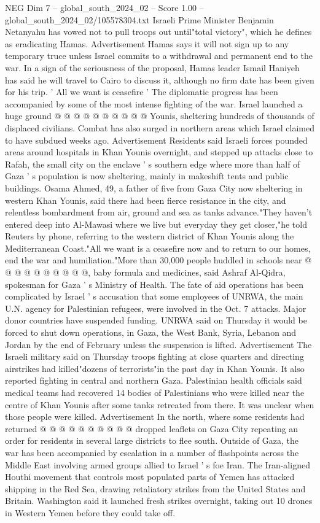 \begin{textsample}{NEG Dim 7 – global\_south\_2024\_02 – Score 1.00 – global\_south\_2024\_02/105578304.txt}
Israeli Prime Minister Benjamin Netanyahu has vowed not to pull troops out until"total victory", which he defines as eradicating Hamas.
Advertisement Hamas says it will not sign up to any temporary truce unless Israel commits to a withdrawal and permanent end to the war.
In a sign of the seriousness of the proposal, Hamas leader Ismail Haniyeh has said he will travel to Cairo to discuss it, although no firm date has been given for his trip. ' All we want is ceasefire ' The diplomatic progress has been accompanied by some of the most intense fighting of the war.
Israel launched a huge ground @ @ @ @ @ @ @ @ @ @ Younis, sheltering hundreds of thousands of displaced civilians.
Combat has also surged in northern areas which Israel claimed to have subdued weeks ago.
Advertisement Residents said Israeli forces pounded areas around hospitals in Khan Younis overnight, and stepped up attacks close to Rafah, the small city on the enclave ' s southern edge where more than half of Gaza ' s population is now sheltering, mainly in makeshift tents and public buildings.
Osama Ahmed, 49, a father of five from Gaza City now sheltering in western Khan Younis, said there had been fierce resistance in the city, and relentless bombardment from air, ground and sea as tanks advance."They haven't entered deep into Al-Mawasi where we live but everyday they get closer,"he told Reuters by phone, referring to the western district of Khan Younis along the Mediterranean Coast."All we want is a ceasefire now and to return to our homes, end the war and humiliation."More than 30,000 people huddled in schools near @ @ @ @ @ @ @ @ @ @, baby formula and medicines, said Ashraf Al-Qidra, spokesman for Gaza ' s Ministry of Health.
The fate of aid operations has been complicated by Israel ' s accusation that some employees of UNRWA, the main U.N. agency for Palestinian refugees, were involved in the Oct. 7 attacks.
Major donor countries have suspended funding.
UNRWA said on Thursday it would be forced to shut down operations, in Gaza, the West Bank, Syria, Lebanon and Jordan by the end of February unless the suspension is lifted.
Advertisement The Israeli military said on Thursday troops fighting at close quarters and directing airstrikes had killed"dozens of terrorists"in the past day in Khan Younis.
It also reported fighting in central and northern Gaza.
Palestinian health officials said medical teams had recovered 14 bodies of Palestinians who were killed near the centre of Khan Younis after some tanks retreated from there.
It was unclear when those people were killed.
Advertisement In the north, where some residents had returned @ @ @ @ @ @ @ @ @ @ dropped leaflets on Gaza City repeating an order for residents in several large districts to flee south.
Outside of Gaza, the war has been accompanied by escalation in a number of flashpoints across the Middle East involving armed groups allied to Israel ' s foe Iran.
The Iran-aligned Houthi movement that controls most populated parts of Yemen has attacked shipping in the Red Sea, drawing retaliatory strikes from the United States and Britain.
Washington said it launched fresh strikes overnight, taking out 10 drones in Western Yemen before they could take off.

\end{textsample}
